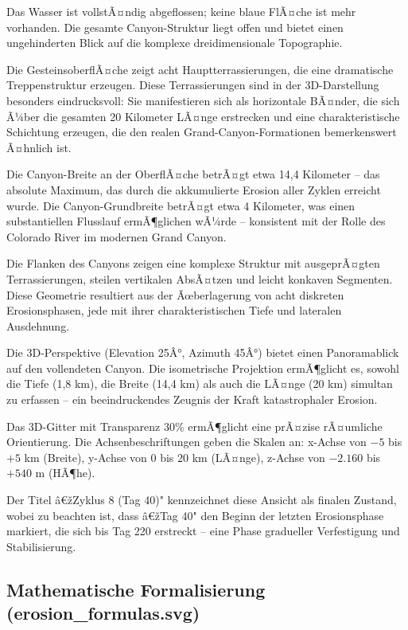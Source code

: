 Das Wasser ist vollstÃ¤ndig abgeflossen; keine blaue FlÃ¤che ist mehr vorhanden. Die gesamte Canyon-Struktur liegt offen und bietet einen ungehinderten Blick auf die komplexe dreidimensionale Topographie.

Die GesteinsoberflÃ¤che zeigt acht Hauptterrassierungen, die eine dramatische Treppenstruktur erzeugen. Diese Terrassierungen sind in der 3D-Darstellung besonders eindrucksvoll: Sie manifestieren sich als horizontale BÃ¤nder, die sich Ã¼ber die gesamten 20 Kilometer LÃ¤nge erstrecken und eine charakteristische Schichtung erzeugen, die den realen Grand-Canyon-Formationen bemerkenswert Ã¤hnlich ist.

Die Canyon-Breite an der OberflÃ¤che betrÃ¤gt etwa 14,4 Kilometer -- das absolute Maximum, das durch die akkumulierte Erosion aller Zyklen erreicht wurde. Die Canyon-Grundbreite betrÃ¤gt etwa 4 Kilometer, was einen substantiellen Flusslauf ermÃ¶glichen wÃ¼rde -- konsistent mit der Rolle des Colorado River im modernen Grand Canyon.

Die Flanken des Canyons zeigen eine komplexe Struktur mit ausgeprÃ¤gten Terrassierungen, steilen vertikalen AbsÃ¤tzen und leicht konkaven Segmenten. Diese Geometrie resultiert aus der Ãœberlagerung von acht diskreten Erosionsphasen, jede mit ihrer charakteristischen Tiefe und lateralen Ausdehnung.

Die 3D-Perspektive (Elevation 25Â°, Azimuth 45Â°) bietet einen Panoramablick auf den vollendeten Canyon. Die isometrische Projektion ermÃ¶glicht es, sowohl die Tiefe (1,8 km), die Breite (14,4 km) als auch die LÃ¤nge (20 km) simultan zu erfassen -- ein beeindruckendes Zeugnis der Kraft katastrophaler Erosion.

Das 3D-Gitter mit Transparenz 30\% ermÃ¶glicht eine prÃ¤zise rÃ¤umliche Orientierung. Die Achsenbeschriftungen geben die Skalen an: x-Achse von $-5$ bis $+5$ km (Breite), y-Achse von $0$ bis $20$ km (LÃ¤nge), z-Achse von $-2.160$ bis $+540$ m (HÃ¶he).

Der Titel â€žZyklus 8 (Tag 40)" kennzeichnet diese Ansicht als finalen Zustand, wobei zu beachten ist, dass â€žTag 40" den Beginn der letzten Erosionsphase markiert, die sich bis Tag 220 erstreckt -- eine Phase gradueller Verfestigung und Stabilisierung.

\subsection{Mathematische Formalisierung (erosion\_formulas.svg)}

